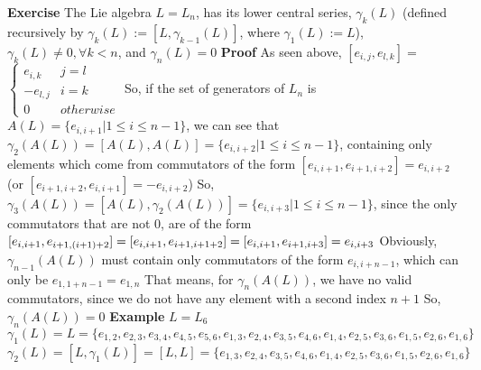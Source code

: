 \documentclass[12pt]{article}
\begin{document}
\textbf{Exercise} \newline
The Lie algebra $L=L_n$, has its lower central series, \newline
$\gamma_k(L)$ (defined recursively by $\gamma_k(L):=[L,\gamma_{k-1}(L)]$, where $\gamma_1(L):=L$), \newline
$\gamma_k(L) \neq 0,\forall k<n$, and $\gamma_n(L)=0$ \newline
\newpage
\textbf{Proof} \newline
As seen above, $[e_{i,j},e_{l,k}]=$
$ \left \{
	\begin{array}{ll}
		e_{i,k}  & j=l \\
        -e_{l,j}  & i=k \\
		0 & otherwise
	\end{array}
\right.
$
\newline 
So, if the set of generators of $L_n$ is $A(L)=
\{ e_{i,i+1} | 1 \leq i \leq n-1 \}$, we can see that \newline
$\gamma_2(A(L))=[A(L),A(L)]=\{ e_{i,i+2} | 1 \leq i \leq n-1 \}$, \newline
containing only elements which come from commutators of the form \newline
$[e_{i,i+1},e_{i+1,i+2}]=e_{i,i+2}$ (or $[e_{i+1,i+2},e_{i,i+1}]=
-e_{i,i+2}$) \newline
So, $\gamma_3(A(L))=[A(L),\gamma_2(A(L))]=\{ e_{i,i+3} | 1 \leq i \leq n-1 \}$, since the only commutators that are not 0, are of the form $[e_{i,i+1},e_{i+1,(i+1)+2}]=[e_{i,i+1},e_{i+1,i+1+2}] \newline
=[e_{i,i+1},e_{i+1,i+3}]=e_{i,i+3}$ \newline
Obviously, $\gamma_{n-1}(A(L))$ must contain only commutators of the form $e_{i,i+n-1}$, which can only be $e_{1,1+n-1}=e_{1,n}$ \newline
That means, for $\gamma_{n}(A(L))$, we have no valid commutators, since we do not have any element with a second index $n+1$ \newline
So, $\gamma_{n}(A(L))=0$ \newline
\newline
\textbf{Example} $L=L_6$ \newline
$\gamma_1(L)=L=\{e_{1,2},e_{2,3},e_{3,4},e_{4,5},e_{5,6},e_{1,3},e_{2,4},e_{3,5},e_{4,6},e_{1,4},e_{2,5},e_{3,6},e_{1,5},e_{2,6},e_{1,6}\}$ \newline
$\gamma_2(L)=[L,\gamma_1(L)]=
[L,L]=\{e_{1,3},e_{2,4},e_{3,5},e_{4,6},e_{1,4},e_{2,5},e_{3,6},e_{1,5},e_{2,6},e_{1,6}\}$ 
\newline
\end{document}
